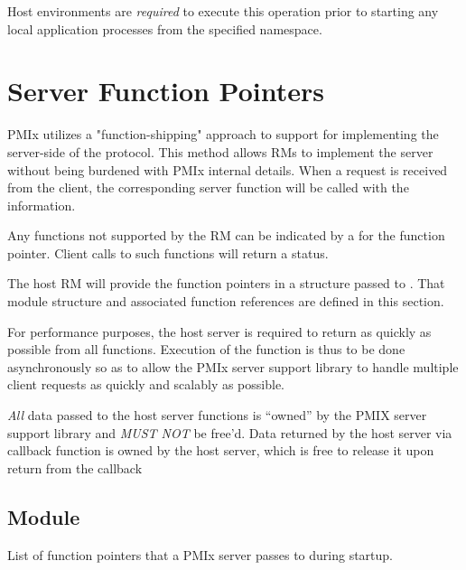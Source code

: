 \advicermstart
Host environments are \textit{required} to execute this operation prior to starting any local application processes from the specified namespace.
\advicermend

\section{Server Function Pointers}

\ac{PMIx} utilizes a "function-shipping" approach to support for implementing the server-side of the protocol. This method allows \acp{RM} to implement the server without being burdened with \ac{PMIx} internal details. When a request is received from the client, the corresponding server function will be called with the information.

Any functions not supported by the \ac{RM} can be indicated by a  for the function pointer. Client calls to such functions will return a  status.

The host \ac{RM} will provide the function pointers in a  structure passed to .
That module structure and associated function references are defined in this section.

\advicermstart
For performance purposes, the host server is required to return as quickly as possible from all functions. Execution of
the function is thus to be done asynchronously so as to allow the \ac{PMIx} server support library to handle multiple client requests
as quickly and scalably as possible.

\textit{All} data passed to the host server functions is ``owned'' by the
PMIX server support library and \textit{MUST NOT} be free'd. Data returned
by the host server via callback function is owned by the host
server, which is free to release it upon return from the callback
\advicermend

\subsection{ Module}

\summary

List of function pointers that a PMIx server passes to  during startup.

\format

